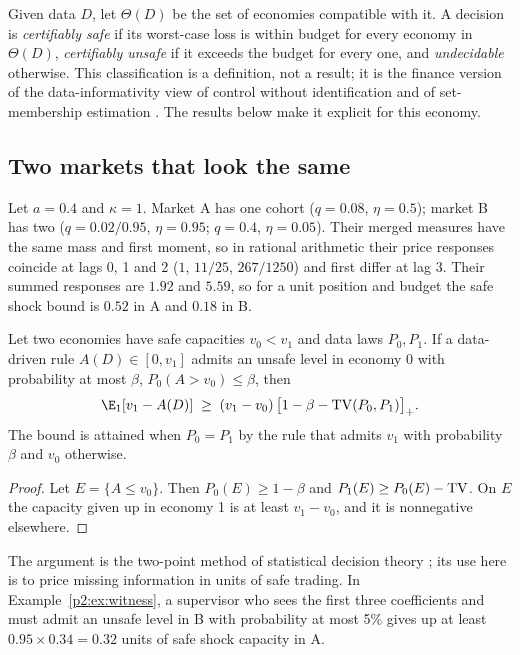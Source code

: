 Given data $D$, let $\Theta(D)$ be the set of economies compatible with it. A decision is \emph{certifiably safe} if its worst-case loss is within budget for every economy in $\Theta(D)$, \emph{certifiably unsafe} if it exceeds the budget for every one, and \emph{undecidable} otherwise. This classification is a definition, not a result; it is the finance version of the data-informativity view of control without identification \citep{p2:vanwaarde2020} and of set-membership estimation \citep{p2:milanese1991}. The results below make it explicit for this economy.

\subsection{Two markets that look the same}

\begin{example}\label{p2:ex:witness}
Let $a=0.4$ and $\kappa=1$. Market A has one cohort ($q=0.08$, $\eta=0.5$); market B has two ($q=0.02/0.95$, $\eta=0.95$; $q=0.4$, $\eta=0.05$). Their merged measures have the same mass and first moment, so in rational arithmetic their price responses coincide at lags 0, 1 and 2 ($1$, $11/25$, $267/1250$) and first differ at lag 3. Their summed responses are $1.92$ and $5.59$, so for a unit position and budget the safe shock bound is $0.52$ in A and $0.18$ in B.
\end{example}

\begin{proposition}\label{p2:prop:twoworld}
Let two economies have safe capacities $v_0<v_1$ and data laws $P_0,P_1$. If a data-driven rule $A(D)\in[0,v_1]$ admits an unsafe level in economy 0 with probability at most $\beta$, $P_0(A>v_0)\le\beta$, then
\[
\E_1[v_1-A(D)]\;\ge\;(v_1-v_0)\,\bigl[1-\beta-{\rm TV}(P_0,P_1)\bigr]_+ .
\]
The bound is attained when $P_0=P_1$ by the rule that admits $v_1$ with probability $\beta$ and $v_0$ otherwise.
\end{proposition}

\begin{proof}
Let $E=\{A\le v_0\}$. Then $P_0(E)\ge1-\beta$ and $P_1(E)\ge P_0(E)-{\rm TV}$. On $E$ the capacity given up in economy 1 is at least $v_1-v_0$, and it is nonnegative elsewhere.
\end{proof}

The argument is the two-point method of statistical decision theory \citep{p2:lecam1986}; its use here is to price missing information in units of safe trading. In Example~\ref{p2:ex:witness}, a supervisor who sees the first three coefficients and must admit an unsafe level in B with probability at most 5\% gives up at least $0.95\times0.34=0.32$ units of safe shock capacity in A.


